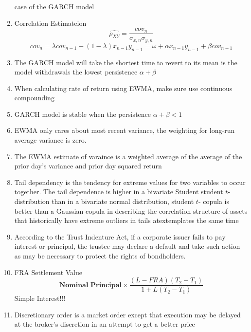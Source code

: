 \documentclass[11pt,fleqn]{book} %
\numberwithin{equation}{section} %
\numberwithin{figure}{section} %
\numberwithin{table}{section} %
\begin{document}
\begin{enumerate}
    case of the GARCH model
    \item Correlation Estimateion
    $$
    \hat{\rho_{XY}}=\frac{cov_n}{\sigma_{x,n}\sigma_{y,n}}
    $$
    $$
    cov_n=\lambda cov_{n-1}+(1-\lambda)x_{n-1}y_{n-1}=\omega+\alpha x_{n-1}y_{n-1}+\beta cov_{n-1}
    $$
    \item The GARCH model will take the shortest time to revert to its mean is the model withdrawals
    the lowest persistence $\alpha+\beta$
    \item When calculating rate of return using EWMA, make sure use continuous compounding
    \item GARCH model is stable when the persistence $\alpha+\beta<1$
    \item EWMA only cares about most recent variance, the weighting for long-run average variance
    is zero.
    \item The EWMA estimate of varaince is a weighted average of the average of the prior
    day's variance and prior day squared return
    \item Tail dependency is the tendency for extreme values for two variables
    to occur together. The tail dependence is higher in a bivariate Student
    student $t$-distribution than in a bivariate normal distribution, student $t$-
    copula is better than a Gaussian copula in describing the correlation
    structure of assets that historically have extreme outliers in tails atextemplates
    the same time
    \item According to the Trust Indenture Act, if a corporate issuer fails to pay
    interest or principal, the trustee may declare a default and take such
    action as may be necessary to protect the rights of bondholders.
    \item FRA Settlement Value
    $$
    \textbf{Nominal Principal}\times\frac{(L-FRA)(T_2-T_1)}{1+L(T_2-T_1)}
    $$
    Simple Interest!!!
    \item Discretionary order is a market order except that execution may be delayed
    at the broker's discretion in an attempt to get a better price
\end{enumerate}
 
 
 
 
 
 
 
 
\end{document}
